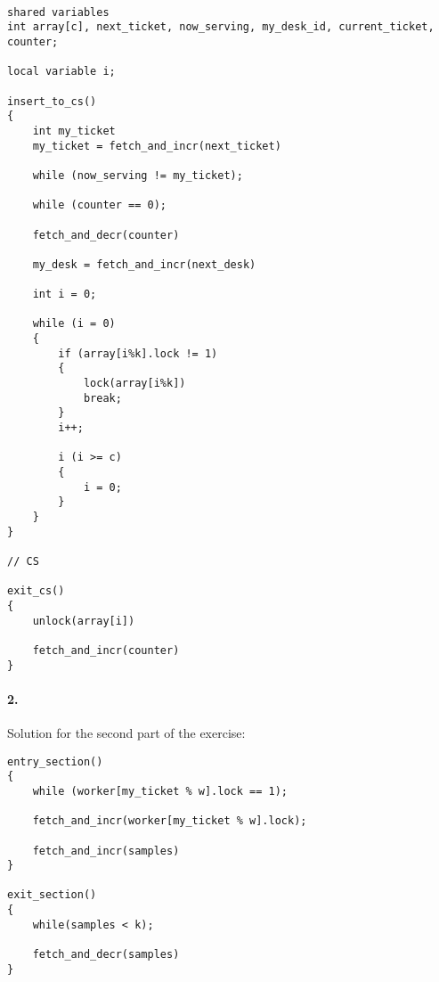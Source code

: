 \begin{lstlisting}

shared variables
int array[c], next_ticket, now_serving, my_desk_id, current_ticket, counter;

local variable i;

insert_to_cs()
{
	int my_ticket	
	my_ticket = fetch_and_incr(next_ticket)

	while (now_serving != my_ticket);

	while (counter == 0);

	fetch_and_decr(counter)

	my_desk = fetch_and_incr(next_desk)

	int i = 0;

	while (i = 0)
	{
		if (array[i%k].lock != 1)
		{
			lock(array[i%k])
			break;
		}
		i++;

		i (i >= c)
		{
			i = 0;
		}
	}
}

// CS

exit_cs()
{
	unlock(array[i])

	fetch_and_incr(counter)
}

\end{lstlisting}

\paragraph{2.}
Solution for the second part of the exercise:

\begin{lstlisting}
entry_section()
{
	while (worker[my_ticket % w].lock == 1);
	
	fetch_and_incr(worker[my_ticket % w].lock);

	fetch_and_incr(samples)
}

exit_section()
{
	while(samples < k);

	fetch_and_decr(samples)
}

\end{lstlisting}

